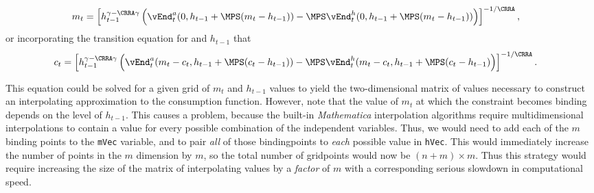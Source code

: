 \documentclass[titlepage]{\econtex}
\newcommand{\Mma}{\textit{Mathematica}}
\begin{document}
{\begin{equation}
\begin{gathered}
\begin{aligned}
    {m}_{t}  & = \left[h_{t-1}^{\gamma-\CRRA\gamma} \left(\vEnd_{t}^{{a}}(0,h_{t-1}+\MPS({m}_{t}-h_{t-1}))-\MPS \vEnd_{t}^{h}(0,h_{t-1}+\MPS({m}_{t}-h_{t-1}))\right)  \right]^{-1/\CRRA}, \label{eq:LCbindsHabits}
  \end{aligned}\end{gathered}\end{equation}
  or incorporating the transition equation for
  and $h_{t-1}$ that
  \begin{equation}\begin{gathered}\begin{aligned}
    {c}_{t}  & = \left[h_{t-1}^{\gamma-\CRRA\gamma}
                  \left(\vEnd_{t}^{{a}}({m}_{t}-{c}_{t},h_{t-1}+\MPS({c}_{t}-h_{t-1}))
                  -\MPS \vEnd_{t}^{h}({m}_{t}-{c}_{t},h_{t-1}+\MPS({c}_{t}-h_{t-1})\right)
                  \right]^{-1/\CRRA}. \nonumber
  \end{aligned}\end{gathered}\end{equation}

  This equation could be solved for a given grid of ${m}_{t}$ and
  $h_{t-1}$ values to yield the two-dimensional matrix of values
  necessary to construct an interpolating approximation to the
  consumption function.  However, note that the value of ${m}_{t}$ at
  which the constraint becomes binding depends on the level of
  $h_{t-1}$.  This causes a problem, because the built-in {\Mma}
  interpolation algorithms require multidimensional interpolations to
  contain a value for every possible combination of the independent
  variables.  Thus, we would need to add each of the $m$ binding
  points to the \texttt{mVec} variable, and to pair \textit{all} of
  those bindingpoints to \textit{each} possible value in \texttt{hVec}.
  This would immediately increase the number of points in the ${m}$
  dimension by $m$, so the total number of gridpoints would now be
  $(n+m) \times m$.  Thus this strategy would require increasing the
  size of the matrix of interpolating values by a \textit{factor} of $m$
  with a corresponding serious slowdown in computational speed.

}
\end{document}
